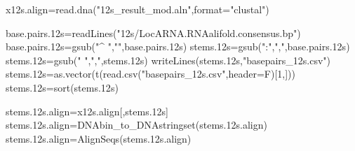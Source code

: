 \documentclass[
]{article}
\newenvironment{Shaded}{\begin{snugshade}}{\end{snugshade}}
\newcommand{\AttributeTok}[1]{\textcolor[rgb]{0.77,0.63,0.00}{#1}}
\newcommand{\DecValTok}[1]{\textcolor[rgb]{0.00,0.00,0.81}{#1}}
\newcommand{\FloatTok}[1]{\textcolor[rgb]{0.00,0.00,0.81}{#1}}
\newcommand{\FunctionTok}[1]{\textcolor[rgb]{0.00,0.00,0.00}{#1}}
\newcommand{\NormalTok}[1]{#1}
\newcommand{\OtherTok}[1]{\textcolor[rgb]{0.56,0.35,0.01}{#1}}
\newcommand{\StringTok}[1]{\textcolor[rgb]{0.31,0.60,0.02}{#1}}
\begin{document}
\begin{Shaded}
\begin{Highlighting}[]
\NormalTok{x12s.align}\OtherTok{=}\FunctionTok{read.dna}\NormalTok{(}\StringTok{"12s\_result\_mod.aln"}\NormalTok{,}\AttributeTok{format=}\StringTok{"clustal"}\NormalTok{)}
\end{Highlighting}
\end{Shaded}

\begin{Shaded}
\end{Shaded}

\begin{Shaded}
\begin{Highlighting}[]
\NormalTok{base.pairs}\FloatTok{.12}\NormalTok{s}\OtherTok{=}\FunctionTok{readLines}\NormalTok{(}\StringTok{"12s/LocARNA.RNAalifold.consensus.bp"}\NormalTok{)}
\NormalTok{base.pairs}\FloatTok{.12}\NormalTok{s}\OtherTok{=}\FunctionTok{gsub}\NormalTok{(}\StringTok{"\^{} "}\NormalTok{,}\StringTok{""}\NormalTok{,base.pairs}\FloatTok{.12}\NormalTok{s)}
\NormalTok{stems}\FloatTok{.12}\NormalTok{s}\OtherTok{=}\FunctionTok{gsub}\NormalTok{(}\StringTok{":"}\NormalTok{,}\StringTok{","}\NormalTok{,base.pairs}\FloatTok{.12}\NormalTok{s)}
\NormalTok{stems}\FloatTok{.12}\NormalTok{s}\OtherTok{=}\FunctionTok{gsub}\NormalTok{(}\StringTok{" "}\NormalTok{,}\StringTok{","}\NormalTok{,stems}\FloatTok{.12}\NormalTok{s)}
\FunctionTok{writeLines}\NormalTok{(stems}\FloatTok{.12}\NormalTok{s,}\StringTok{"basepairs\_12s.csv"}\NormalTok{)}
\NormalTok{stems}\FloatTok{.12}\NormalTok{s}\OtherTok{=}\FunctionTok{as.vector}\NormalTok{(}\FunctionTok{t}\NormalTok{(}\FunctionTok{read.csv}\NormalTok{(}\StringTok{"basepairs\_12s.csv"}\NormalTok{,}\AttributeTok{header=}\NormalTok{F)[}\DecValTok{1}\NormalTok{,]))}
\NormalTok{stems}\FloatTok{.12}\NormalTok{s}\OtherTok{=}\FunctionTok{sort}\NormalTok{(stems}\FloatTok{.12}\NormalTok{s)}
\end{Highlighting}
\end{Shaded}

\begin{Shaded}
\begin{Highlighting}[]
\NormalTok{stems}\FloatTok{.12}\NormalTok{s.align}\OtherTok{=}\NormalTok{x12s.align[,stems}\FloatTok{.12}\NormalTok{s]}
\NormalTok{stems}\FloatTok{.12}\NormalTok{s.align}\OtherTok{=}\FunctionTok{DNAbin\_to\_DNAstringset}\NormalTok{(stems}\FloatTok{.12}\NormalTok{s.align)}
\NormalTok{stems}\FloatTok{.12}\NormalTok{s.align}\OtherTok{=}\FunctionTok{AlignSeqs}\NormalTok{(stems}\FloatTok{.12}\NormalTok{s.align)}
\end{Highlighting}
\end{Shaded}
\end{document}
